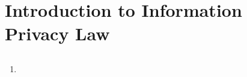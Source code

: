 \section{Introduction to Information Privacy Law}

\subsection{}

\begin{enumerate}
    \item %
\end{enumerate}


